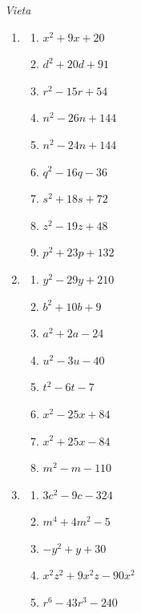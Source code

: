 \begin{ueb}
\begin{enumerate}[resume]
    \end{enumerate}
    \emph{Vieta}
    \begin{enumerate}[resume]
        \item
              \begin{enumerate}
                  \item \(x^2+9x+20\)
                  \item \(d^2+20d+91\)
                  \item \(r^2-15r+54\)
                  \item \(n^2-26n+144\)
                  \item \(n^2-24n+144\)
                  \item \(q^2-16q-36\)
                  \item \(s^2+18s+72\)
                  \item \(z^2-19z+48\)
                  \item \(p^2+23p+132\)
              \end{enumerate}

        \item
              \begin{enumerate}
                  \item \(y^2-29y+210\)
                  \item \(b^2+10b+9\)
                  \item \(a^2+2a-24\)
                  \item \(u^2-3u-40\)
                  \item \(t^2-6t-7\)
                  \item \(x^2-25x+84\)
                  \item \(x^2+25x-84\)
                  \item \(m^2-m-110\)
              \end{enumerate}

        \item
              \begin{enumerate}
                  \item \(3c^2-9c-324\)
                  \item \(m^4+4m^2-5\)
                  \item \(-y^2+y+30\)
                  \item \(x^2z^2+9x^2z-90x^2\)
                  \item \(r^6-43r^3-240\)
              \end{enumerate}


\end{enumerate}
\end{ueb}
